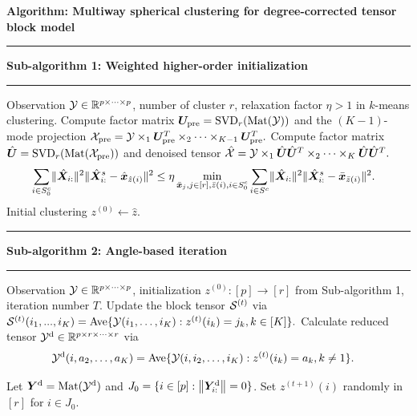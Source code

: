 \documentclass[lettersize,onecolumn,journal]{IEEEtran}
\theoremstyle{definition}
\theoremstyle{definition}
\newcommand\Algphase[1]{%
\vspace*{-.7\baselineskip}\Statex\hspace*{\dimexpr-\algorithmicindent-2pt\relax}\rule{\columnwidth}{0.4pt}%
\Statex\hspace*{-\algorithmicindent}\textbf{#1}%
\vspace*{-.7\baselineskip}\Statex\hspace*{\dimexpr-\algorithmicindent-2pt\relax}\rule{\columnwidth}{0.4pt}%
}
\begin{document}
\begin{algorithm}[h!]
\caption*{\bf Algorithm: Multiway spherical clustering for degree-corrected tensor block model }
\vspace{.15cm}
\begin{algorithmic}[1]
\Algphase{Sub-algorithm 1: Weighted higher-order initialization}
\INPUT Observation $\mathcal{Y} \in \mathbb{R}^{p\times \cdots \times p}$, number of cluster $r$, relaxation factor $\eta > 1$ in $k$-means clustering.
\State Compute factor matrix $ \bm{U}_{\text{pre}} = \text{SVD}_{r} (\text{Mat}(\mathcal{Y}))$ and the $(K-1)$-mode projection $
\mathcal{X}_{\text{pre}} = \mathcal{Y} \times_1  \bm{U}_{\text{pre}}^T \times_2 \cdots \times_{K-1} \bm{U}_{\text{pre}}^T.$
\State Compute factor matrix $\hat {\bm{U}} = \text{SVD}_{r}(\text{Mat}(\mathcal{X}_{\text{pre}}))$ and denoised tensor
$\hat {\mathcal{X}} = \mathcal{Y} \times_1 \hat {\bm{U}} \hat {\bm{U}}^T \times_2 \cdots \times_K \hat {\bm{U}} \hat {\bm{U}}^T.$
\begin{align}
    &\sum_{i \in S_0^c }  \lVert\hat {\bm X}_{i:}\rVert^2 \lVert\hat {\bm X}_{i:}^s - \hat {\bm x}_{\hat z(i)} \rVert^2 
    \leq 
    \eta \min_{\substack{\bar {\bm x}_j, j\in[r], \bar z(i),i\in S_0^{c}}} \sum_{i \in S^c } \lVert\hat {\bm X}_{i:}\rVert^2 \lVert \hat {\bm X}_{i:}^s -   \bar {\bm x}_{\bar z(i)}\rVert^2.
\end{align}
\OUTPUT Initial clustering $z^{(0)} \leftarrow \hat z$.

\Algphase{Sub-algorithm 2: Angle-based iteration}
\INPUT Observation $\mathcal{Y} \in \mathbb{R}^{p \times \cdots \times p}$, initialization $z^{(0)} \colon [p]\to[r]$ from Sub-algorithm 1, iteration number $T$.
\State Update the block tensor $\mathcal{S}^{(t)}$ via
$\mathcal{S}^{(t)} (i_1,...,i_K)= \text{Ave} \{\mathcal{Y}(i_1,\ldots,i_K): z^{(t)}(i_k) = j_k, k \in [K]\}.$
\State Calculate reduced tensor $\mathcal{Y}^{\text{d}} \in \mathbb{R}^{p \times r \times \cdots \times r}$ via
\begin{align}
    &\mathcal{Y}^{\text{d}}(i,a_2,\ldots,a_K) 
    = 
\text{Ave}\{\mathcal{Y}(i,i_2,\ldots,i_K): z^{(t)}(i_k) = a_k, k \neq 1 \}.
\end{align}

\State Let $\bm Y^{\text{d}} = \text{Mat}(\mathcal{Y}^{\text{d}})$ and $J_0 = \{ i\in[p]: \left\lVert\bm Y^{\text{d}}_{i:}\right\rVert = 0\}$. Set $z^{(t+1)}(i)$ randomly in $[r]$ for $i \in J_0$.


\end{algorithmic}
\end{algorithm}
\end{document}

